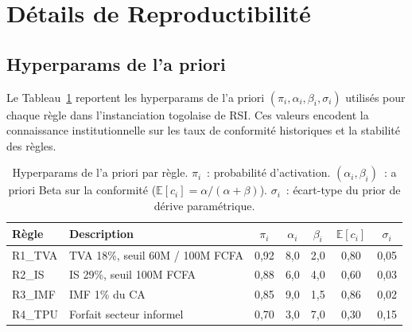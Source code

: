 \documentclass[letterpaper]{article}
\begin{document}
\section{D\'etails de Reproductibilit\'e}
\label{app:reproductibilite}

\subsection{Hyperparams de l'a priori}

Le Tableau~\ref{tab:hyperparams} reportent les hyperparams de l'a
priori $(\pi_i, \alpha_i, \beta_i, \sigma_i)$ utilis\'es pour chaque
r\`egle dans l'instanciation togolaise de RSI. Ces valeurs encodent
la connaissance institutionnelle sur les taux de conformit\'e
historiques et la stabilit\'e des r\`egles.

\begin{table}[H]
\centering
\caption{Hyperparams de l'a priori par r\`egle. $\pi_i$~: probabilit\'e
d'activation. $(\alpha_i, \beta_i)$~: a priori Beta sur la conformit\'e
($\mathbb{E}[c_i] = \alpha/(\alpha+\beta)$). $\sigma_i$~: \'ecart-type
du prior de d\'erive param\'etrique.}
\label{tab:hyperparams}
\renewcommand{\arraystretch}{1.3}
\begin{tabular}{llccccc}
\toprule
\textbf{R\`egle} & \textbf{Description} & $\pi_i$ & $\alpha_i$ & $\beta_i$
  & $\mathbb{E}[c_i]$ & $\sigma_i$ \\
\midrule
R1\_TVA & TVA 18\%, seuil 60M / 100M FCFA & 0,92 & 8,0 & 2,0 & 0,80 & 0,05 \\
R2\_IS  & IS 29\%, seuil 100M FCFA         & 0,88 & 6,0 & 4,0 & 0,60 & 0,03 \\
R3\_IMF & IMF 1\% du CA                     & 0,85 & 9,0 & 1,5 & 0,86 & 0,02 \\
R4\_TPU & Forfait secteur informel          & 0,70 & 3,0 & 7,0 & 0,30 & 0,15 \\
\bottomrule
\end{tabular}
\end{table}
\end{document}
